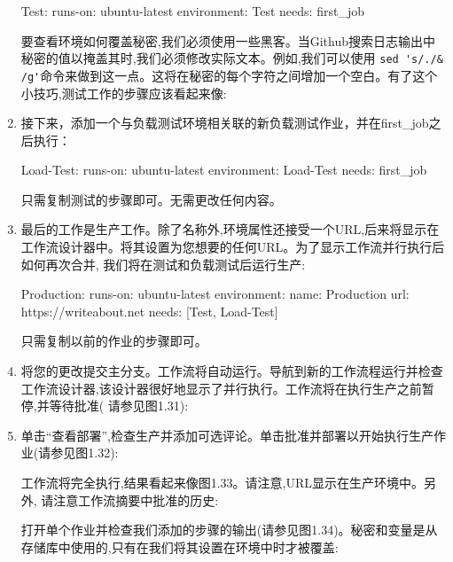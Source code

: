 \begin{enumerate}
\begin{shell}
Test:
  runs-on: ubuntu-latest
  environment: Test
  needs: first_job
\end{shell}

要查看环境如何覆盖秘密,我们必须使用一些黑客。当Github搜索日志输出中秘密的值以掩盖其时,我们必须修改实际文本。例如,我们可以使用 \verb|sed 's/./& /g'|命令来做到这一点。这将在秘密的每个字符之间增加一个空白。有了这个小技巧,测试工作的步骤应该看起来像:


\item 
接下来，添加一个与负载测试环境相关联的新负载测试作业，并在first\_job之后执行：

\begin{shell}
Load-Test:
  runs-on: ubuntu-latest
  environment: Load-Test
  needs: first_job
\end{shell}

只需复制测试的步骤即可。无需更改任何内容。

\item 
最后的工作是生产工作。除了名称外,环境属性还接受一个URL,后来将显示在工作流设计器中。将其设置为您想要的任何URL。为了显示工作流并行执行后如何再次合并, 我们将在测试和负载测试后运行生产:

\begin{shell}
Production:
  runs-on: ubuntu-latest
  environment:
    name: Production
    url: https://writeabout.net
  needs: [Test, Load-Test]
\end{shell}

只需复制以前的作业的步骤即可。

\item 
将您的更改提交主分支。工作流将自动运行。导航到新的工作流程运行并检查工作流设计器,该设计器很好地显示了并行执行。工作流将在执行生产之前暂停,并等待批准( 请参见图1.31):


\item 
单击“查看部署”,检查生产并添加可选评论。单击批准并部署以开始执行生产作业(请参见图1.32):


工作流将完全执行,结果看起来像图1.33。请注意,URL显示在生产环境中。另外, 请注意工作流摘要中批准的历史:


打开单个作业并检查我们添加的步骤的输出(请参见图1.34)。秘密和变量是从存储库中使用的,只有在我们将其设置在环境中时才被覆盖:


\end{enumerate}

